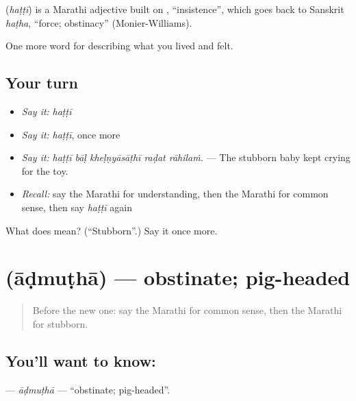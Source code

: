 \begin{cousinweb}
\textbf{} (\emph{haṭṭī}) is a Marathi adjective built on , \textquotedblleft{}insistence\textquotedblright{}, which goes back to Sanskrit \emph{haṭha}, \textquotedblleft{}force; obstinacy\textquotedblright{} (Monier-Williams).
\end{cousinweb}

\begin{grammarlens}[title={What you've built}]
One more word for describing what you lived and felt.
\end{grammarlens}

\subsection*{Your turn}
\begin{itemize}
\raggedright
  \item \emph{Say it:} \emph{haṭṭī}
  \item \emph{Say it:} \emph{haṭṭī}, once more
  \item \emph{Say it:} \emph{haṭṭī bāḷ kheḷṇyāsāṭhī raḍat rāhilaṁ.} — The stubborn baby kept crying for the toy.
  \item \emph{Recall:} say the Marathi for understanding, then the Marathi for common sense, then say \emph{haṭṭī} again
\end{itemize}

\begin{tcolorbox}[breakable,colback=teal!4,colframe=teal!35!black,title={Before you move on}]
What does  mean? (\textquotedblleft{}Stubborn\textquotedblright{}.) Say it once more.
\end{tcolorbox}
\section[\texorpdfstring{\mr{आडमुठा} (āḍmuṭhā)}{आडमुठा (āḍmuṭhā)}]{ (āḍmuṭhā) — obstinate; pig-headed}

\label{lesson:MR-C472-admutha}



\begin{quote}
Before the new one: say the Marathi for common sense, then the Marathi for stubborn.
\end{quote}

\subsection*{You'll want to know: }
\textbf{} — \emph{āḍmuṭhā} — \textquotedblleft{}obstinate; pig-headed\textquotedblright{}.

